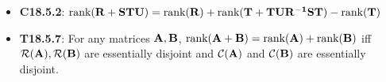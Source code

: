 \documentclass[a4paper, oneside]{book}
\begin{document}
\begin{itemize}
\item \textbf{C18.5.2}: $\text{rank}(\mathbf{R+STU}) = \text{rank}(\mathbf R) + \text{rank}(\mathbf{T+TUR^{-1}ST}) - \text{rank}(\mathbf T)$
\item \textbf{T18.5.7}: For any matrices $\mathbf{A,B}$, $\text{rank}(\mathbf{A+B}) = \text{rank}(\mathbf A)+\text{rank}(\mathbf B)$ iff $\mathcal{R}(\mathbf A), \mathcal{R}(\mathbf B)$ are essentially disjoint and $\mathcal{C}(\mathbf{A})$ and $\mathcal{C}(\mathbf{B})$ are essentially disjoint.
\end{itemize}
\end{document}
